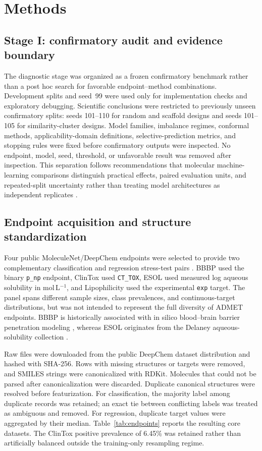 \section{Methods}
\label{sec:methods}

\subsection{Stage I: confirmatory audit and evidence boundary}

The diagnostic stage was organized as a frozen confirmatory benchmark rather than a post hoc search for favorable endpoint--method combinations. Development splits and seed~99 were used only for implementation checks and exploratory debugging. Scientific conclusions were restricted to previously unseen confirmatory splits: seeds 101--110 for random and scaffold designs and seeds 101--105 for similarity-cluster designs. Model families, imbalance regimes, conformal methods, applicability-domain definitions, selective-prediction metrics, and stopping rules were fixed before confirmatory outputs were inspected. No endpoint, model, seed, threshold, or unfavorable result was removed after inspection. This separation follows recommendations that molecular machine-learning comparisons distinguish practical effects, paired evaluation units, and repeated-split uncertainty rather than treating model architectures as independent replicates \citep{ash2025comparison}.

\subsection{Endpoint acquisition and structure standardization}

Four public MoleculeNet/DeepChem endpoints were selected to provide two complementary classification and regression stress-test pairs \citep{wu2018moleculenet}. BBBP used the binary \texttt{p\_np} endpoint, ClinTox used \texttt{CT\_TOX}, ESOL used measured log aqueous solubility in mol\,L$^{-1}$, and Lipophilicity used the experimental \texttt{exp} target. The panel spans different sample sizes, class prevalences, and continuous-target distributions, but was not intended to represent the full diversity of ADMET endpoints. BBBP is historically associated with in silico blood--brain barrier penetration modeling \citep{martins2012bbbp}, whereas ESOL originates from the Delaney aqueous-solubility collection \citep{delaney2004esol}.

Raw files were downloaded from the public DeepChem dataset distribution and hashed with SHA-256. Rows with missing structures or targets were removed, and SMILES strings were canonicalized with RDKit. Molecules that could not be parsed after canonicalization were discarded. Duplicate canonical structures were resolved before featurization. For classification, the majority label among duplicate records was retained; an exact tie between conflicting labels was treated as ambiguous and removed. For regression, duplicate target values were aggregated by their median. Table~\ref{tab:endpoints} reports the resulting core datasets. The ClinTox positive prevalence of 6.45\% was retained rather than artificially balanced outside the training-only resampling regime.

